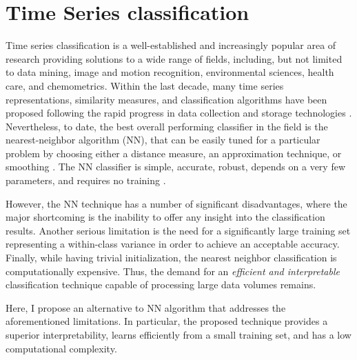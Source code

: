 \section{Time Series classification}
Time series classification is a well-established and increasingly popular area of research providing solutions to a wide 
range of fields, including, but not limited to data mining, image and motion recognition, environmental sciences, health care, 
and chemometrics. 
Within the last decade, many time series representations, similarity measures, and classification algorithms 
have been proposed following the rapid progress in data collection and storage technologies \cite{citeulike:10358271}. 
Nevertheless, to date, the best overall performing classifier in the field is the nearest-neighbor algorithm (NN), 
that can be easily tuned for a particular problem by choosing either a distance measure, an approximation technique, 
or smoothing \cite{citeulike:10358271}.
The NN classifier is simple, accurate, robust, depends on a very few parameters, and requires no training 
\cite{citeulike:10358271} \cite{citeulike:532340} \cite{citeulike:12563424}.


However, the NN technique has a number of significant disadvantages, where the major shortcoming is the 
inability to offer any insight into the classification results. 
Another serious limitation is the need for a significantly large training set representing a within-class 
variance in order to achieve an acceptable accuracy. 
Finally, while having trivial initialization, the nearest neighbor classification is computationally expensive. 
Thus, the demand for an \textit{efficient and interpretable} classification technique capable of processing 
large data volumes remains.

Here, I propose an alternative to NN algorithm that addresses the aforementioned limitations. 
In particular, the proposed technique provides a superior interpretability, learns efficiently from a small 
training set, and has a low computational complexity. 

